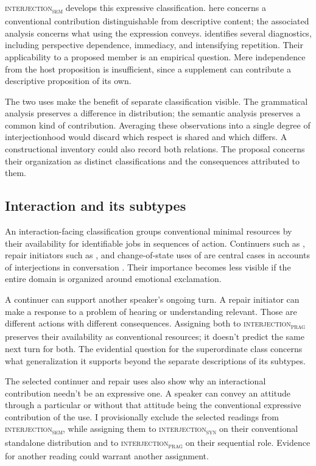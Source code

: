 \documentclass[12pt]{article}
\newcommand{\intj}[1]{\textsc{interjection\textsubscript{#1}}}
\begin{document}
\intj{sem} develops this expressive classification.  here
concerns a conventional contribution distinguishable from descriptive content;
the associated  analysis concerns what using the
expression conveys. \textcite[166--167]{potts2007} identifies several diagnostics, including
perspective dependence, immediacy, and intensifying repetition. Their applicability to a proposed member is an
empirical question. Mere independence from the host proposition is
insufficient, since a supplement can contribute a descriptive proposition
of its own.

The two  uses make the benefit of separate classification
visible. The grammatical analysis preserves a difference in distribution;
the semantic analysis preserves a common kind of contribution. Averaging
these observations into a single degree of interjectionhood would discard
which respect is shared and which differs. A constructional inventory could
also record both relations. The proposal concerns their organization as
distinct classifications and the consequences attributed to them.

\subsection{Interaction and its subtypes}

An interaction-facing classification groups conventional minimal resources
by their availability for identifiable jobs in sequences of action.
Continuers such as , repair initiators such as ,
and change-of-state uses of  are central cases in accounts of
interjections in conversation \citep[257--259, 263--265]{dingemanse2024}.
Their importance becomes less visible if the entire domain is organized
around emotional exclamation.

A continuer can support another speaker's ongoing turn. A repair initiator
can make a response to a problem of hearing or understanding relevant.
Those are different actions with different consequences. Assigning both
to \intj{prag} preserves their availability as conventional resources;
it doesn't predict the same next turn for both. The evidential question
for the superordinate class concerns what generalization it supports beyond
the separate descriptions of its subtypes.

The selected continuer and repair uses also show why an interactional
contribution needn't be an expressive one. A speaker can convey an attitude
through a particular  or  without that attitude
being the conventional expressive contribution of the use. I provisionally
exclude the selected readings from \intj{sem}, while assigning them to
\intj{syn} on their conventional standalone distribution and to \intj{prag}
on their sequential role. Evidence for another reading could warrant another
assignment.
\end{document}
